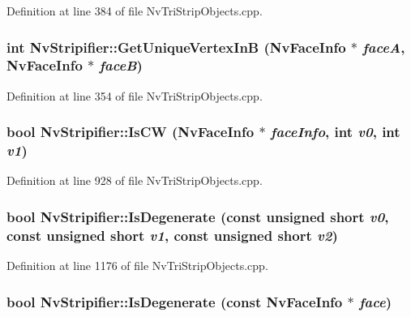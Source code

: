 Definition at line 384 of file NvTriStripObjects.cpp.\hypertarget{class_nv_stripifier_5162c2dab0c5f466a7a4024bc8f3f937}{
\subsubsection[{GetUniqueVertexInB}]{\setlength{\rightskip}{0pt plus 5cm}int NvStripifier::GetUniqueVertexInB ({\bf NvFaceInfo} $\ast$ {\em faceA}, \/  {\bf NvFaceInfo} $\ast$ {\em faceB})}}
\label{class_nv_stripifier_5162c2dab0c5f466a7a4024bc8f3f937}




Definition at line 354 of file NvTriStripObjects.cpp.\hypertarget{class_nv_stripifier_9f4e13a6706b11e6634accb73ad43ba6}{
\subsubsection[{IsCW}]{\setlength{\rightskip}{0pt plus 5cm}bool NvStripifier::IsCW ({\bf NvFaceInfo} $\ast$ {\em faceInfo}, \/  int {\em v0}, \/  int {\em v1})}}
\label{class_nv_stripifier_9f4e13a6706b11e6634accb73ad43ba6}




Definition at line 928 of file NvTriStripObjects.cpp.\hypertarget{class_nv_stripifier_7e10e9120d094e395cc4212bcc5ab51c}{
\subsubsection[{IsDegenerate}]{\setlength{\rightskip}{0pt plus 5cm}bool NvStripifier::IsDegenerate (const unsigned short {\em v0}, \/  const unsigned short {\em v1}, \/  const unsigned short {\em v2})}}
\label{class_nv_stripifier_7e10e9120d094e395cc4212bcc5ab51c}




Definition at line 1176 of file NvTriStripObjects.cpp.\hypertarget{class_nv_stripifier_3eb21915c9f371bfb591ed289e61b955}{
\subsubsection[{IsDegenerate}]{\setlength{\rightskip}{0pt plus 5cm}bool NvStripifier::IsDegenerate (const {\bf NvFaceInfo} $\ast$ {\em face})}}
\label{class_nv_stripifier_3eb21915c9f371bfb591ed289e61b955}




